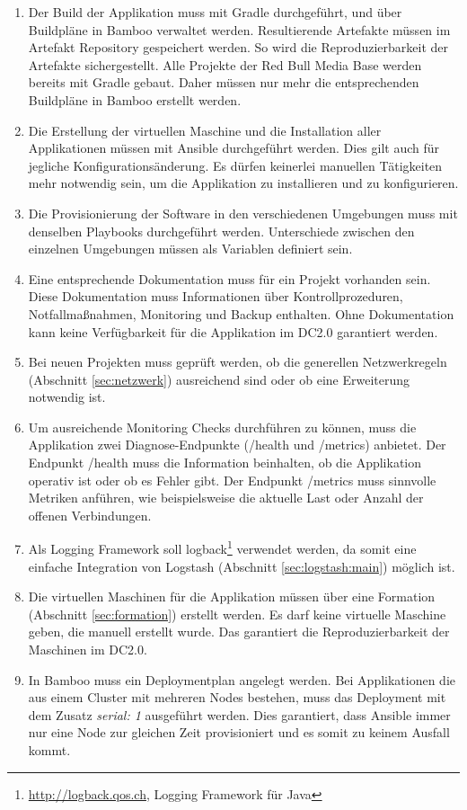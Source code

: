 \begin{enumerate}
	\item Der Build der Applikation muss mit Gradle durchgeführt, und über Buildpläne in Bamboo verwaltet werden. Resultierende Artefakte müssen im Artefakt Repository gespeichert werden. So wird die Reproduzierbarkeit der Artefakte sichergestellt. Alle Projekte der Red Bull Media Base werden bereits mit Gradle gebaut. Daher müssen nur mehr die entsprechenden Buildpläne in Bamboo erstellt werden.
	\item Die Erstellung der virtuellen Maschine und die Installation aller Applikationen müssen mit Ansible durchgeführt werden. Dies gilt auch für jegliche Konfigurationsänderung. Es dürfen keinerlei manuellen Tätigkeiten mehr notwendig sein, um die Applikation zu installieren und zu konfigurieren. 
	\item Die Provisionierung der Software in den verschiedenen Umgebungen muss mit denselben Playbooks durchgeführt werden. Unterschiede zwischen den einzelnen Umgebungen müssen als Variablen definiert sein.
	\item Eine entsprechende Dokumentation muss für ein Projekt vorhanden sein. Diese Dokumentation muss Informationen über Kontrollprozeduren, Notfallmaßnahmen, Monitoring und Backup enthalten. Ohne Dokumentation kann keine Verfügbarkeit für die Applikation im DC2.0 garantiert werden.
	\item Bei neuen Projekten muss geprüft werden, ob die generellen Netzwerkregeln (Abschnitt \ref{sec:netzwerk}) ausreichend sind oder ob eine Erweiterung notwendig ist.
	\item Um ausreichende Monitoring Checks durchführen zu können, muss die Applikation zwei Diagnose-Endpunkte (/health und /metrics) anbietet. Der Endpunkt /health muss die Information beinhalten, ob die Applikation operativ ist oder ob es Fehler gibt. Der Endpunkt /metrics muss sinnvolle Metriken anführen, wie beispielsweise die aktuelle Last oder Anzahl der offenen Verbindungen.
	\item Als Logging Framework soll logback\footnote{\url{http://logback.qos.ch}, Logging Framework für Java} verwendet werden, da somit eine einfache Integration von Logstash (Abschnitt \ref{sec:logstash:main}) möglich ist.
	\item Die virtuellen Maschinen für die Applikation müssen über eine Formation (Abschnitt \ref{sec:formation}) erstellt werden. Es darf keine virtuelle Maschine geben, die manuell erstellt wurde. Das garantiert die Reproduzierbarkeit der Maschinen im DC2.0.
	\item In Bamboo muss ein Deploymentplan angelegt werden. Bei Applikationen die aus einem Cluster mit mehreren Nodes bestehen, muss das Deployment mit dem Zusatz \textit{serial: 1} ausgeführt werden. Dies garantiert, dass Ansible immer nur eine Node zur gleichen Zeit provisioniert und es somit zu keinem Ausfall kommt.

\end{enumerate}
